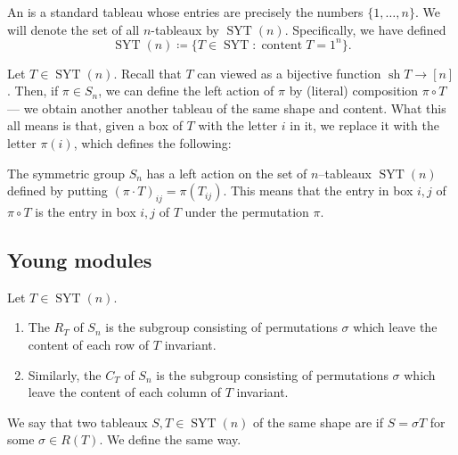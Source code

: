 \documentclass{article}
\DeclareMathOperator{\sh}{sh}
\DeclareMathOperator{\content}{content}
\DeclareMathOperator{\SYT}{SYT}
\begin{document}
\begin{definition}
    An  is a standard tableau whose entries are precisely the numbers $\{1,\ldots,n\}$.
    We will denote the set of all $n$-tableaux by $\SYT(n)$.
    Specifically, we have defined
    \[
        \SYT(n)
        \coloneq
        \{T \in \SYT : \content T = 1^n\}.
    \]
\end{definition}

Let $T \in \SYT(n)$.
Recall that $T$ can viewed as a bijective function $\sh T \to [n]$.
Then, if $\pi \in S_n$, we can define the left action of $\pi$ by (literal) composition $\pi \circ T$--- we obtain another another tableau of the same shape and content.
What this all means is that, given a box of $T$ with the letter $i$ in it, we replace it with the letter $\pi(i)$, which defines the following:

\begin{definition}
    The symmetric group $S_n$ has a left action on the set of $n$--tableaux $\SYT(n)$ defined by putting $(\pi \cdot T)_{ij} = \pi (T_{ij})$.
    This means that the entry in box $i,j$ of $\pi \circ T$ is the entry in box $i,j$ of $T$ under the permutation $\pi$.
\end{definition}

\subsection{Young modules}

\begin{definition}
    Let $T \in \SYT(n)$.
    \begin{enumerate}[label=(\alph*)]
        \item 
    The  $R_T$ of $S_n$ is the subgroup consisting of permutations $\sigma$ which leave the content of each row of $T$ invariant.
        \item 
            Similarly, the  $C_T$ of $S_n$ is the subgroup consisting of permutations $\sigma$ which leave the content of each column of $T$ invariant.
    \end{enumerate}
\end{definition}

\begin{definition}
    We say that two tableaux $S,T \in \SYT(n)$ of the same shape are  if $S = \sigma T$ for some $\sigma \in R(T)$.
    We define  the same way.
\end{definition}
\end{document}
